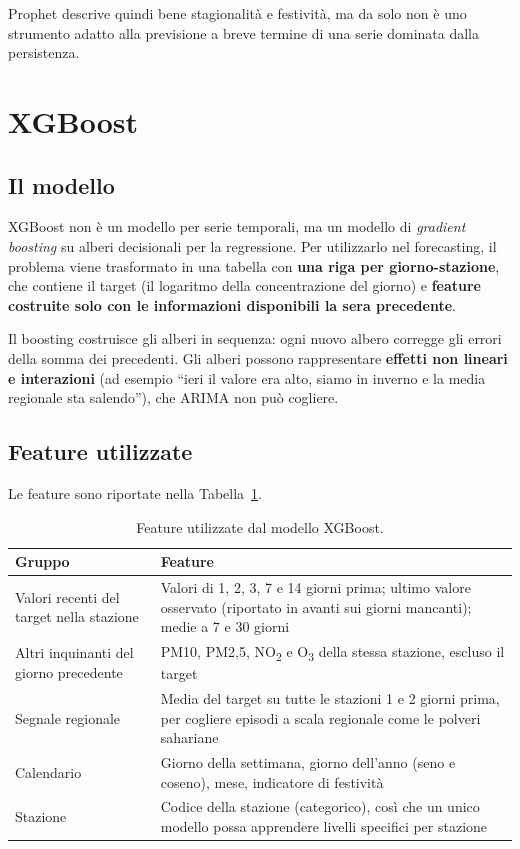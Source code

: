 \documentclass[11pt]{report}
\begin{document}
Prophet descrive quindi bene stagionalità e festività, ma da solo non è uno
strumento adatto alla previsione a breve termine di una serie dominata dalla
persistenza.

\section{XGBoost}
\label{sec:fc_xgboost}

\subsection{Il modello}
XGBoost non è un modello per serie temporali, ma un modello di \emph{gradient
boosting} su alberi decisionali per la regressione. Per utilizzarlo nel
forecasting, il problema viene trasformato in una tabella con \textbf{una riga per
giorno-stazione}, che contiene il target (il logaritmo della concentrazione del
giorno) e \textbf{feature costruite solo con le informazioni disponibili la sera
precedente}.

Il boosting costruisce gli alberi in sequenza: ogni nuovo albero corregge gli
errori della somma dei precedenti. Gli alberi possono rappresentare \textbf{effetti
non lineari e interazioni} (ad esempio ``ieri il valore era alto, siamo in inverno
e la media regionale sta salendo''), che ARIMA non può cogliere.

\subsection{Feature utilizzate}
Le feature sono riportate nella Tabella~\ref{tab:fc_feature}.

\begin{table}[H]
  \centering
  \caption{Feature utilizzate dal modello XGBoost.}
  \label{tab:fc_feature}
  \small
  \begin{tabularx}{\textwidth}{@{}>{\raggedright\arraybackslash}p{4cm} >{\raggedright\arraybackslash}X@{}}
    \toprule
    \textbf{Gruppo} & \textbf{Feature} \\
    \midrule
    Valori recenti del target nella stazione & Valori di 1, 2, 3, 7 e 14 giorni prima; ultimo valore osservato (riportato in avanti sui giorni mancanti); medie a 7 e 30 giorni \\
    \addlinespace
    Altri inquinanti del giorno precedente & PM10, PM2,5, NO\textsubscript{2} e O\textsubscript{3} della stessa stazione, escluso il target \\
    \addlinespace
    Segnale regionale & Media del target su tutte le stazioni 1 e 2 giorni prima, per cogliere episodi a scala regionale come le polveri sahariane \\
    \addlinespace
    Calendario & Giorno della settimana, giorno dell'anno (seno e coseno), mese, indicatore di festività \\
    \addlinespace
    Stazione & Codice della stazione (categorico), così che un unico modello possa apprendere livelli specifici per stazione \\
    \bottomrule
  \end{tabularx}
\end{table}
\end{document}

